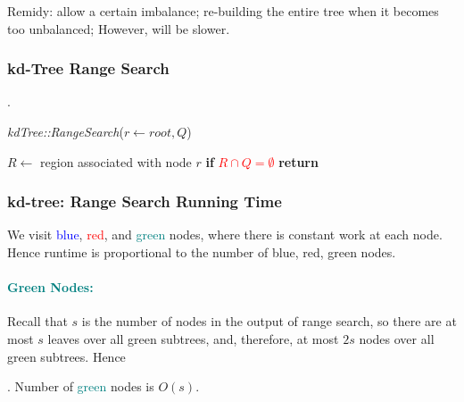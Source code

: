 \documentclass{article}
\begin{document}
\begin{solution}
    Remidy: allow a certain imbalance; re-building the entire tree when it becomes too unbalanced; However,  will be slower. 
\end{solution}

\subsubsection{kd-Tree Range Search}

\begin{codes}[].
    \begin{algorithm}[H]
        \caption{\textit{kdTree::RangeSearch}($r \leftarrow root, Q$)}
        $R \gets$ region associated with node $r$ \;
        \textbf{if} \textcolor{red}{$R \cap Q = \emptyset$} \textbf{return}\;
    \end{algorithm}
\end{codes}

\subsubsection{kd-tree: Range Search Running Time} 

We visit \textcolor{blue}{blue}, \textcolor{red}{red}, and \textcolor{teal}{green} nodes, where there is constant work at each node. Hence runtime is proportional to the number of blue, red, green nodes. 

\paragraph{\textcolor{teal}{Green Nodes:}}

Recall that $s$ is the number of nodes in the output of range search, so there are at most $s$ leaves over all green subtrees, and, therefore, at most $2s$ nodes over all green subtrees. Hence 
\begin{thmm}[].
    Number of \textcolor{teal}{green} nodes is $O(s)$. 
\end{thmm}
\end{document}
